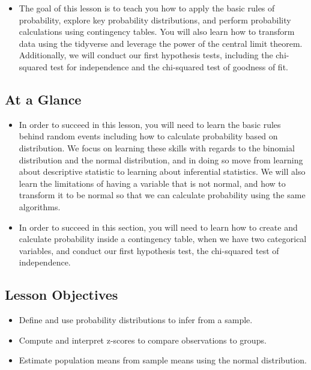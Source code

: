 \documentclass[
  letterpaper,
  DIV=11,
  numbers=noendperiod]{scrreprt}
\providecommand{\tightlist}{%
  \setlength{\itemsep}{0pt}\setlength{\parskip}{0pt}}\usepackage{longtable,booktabs,array}
\begin{document}
\begin{itemize}
\tightlist
\item
  The goal of this lesson is to teach you how to apply the basic rules
  of probability, explore key probability distributions, and perform
  probability calculations using contingency tables. You will also learn
  how to transform data using the tidyverse and leverage the power of
  the central limit theorem. Additionally, we will conduct our first
  hypothesis tests, including the chi-squared test for independence and
  the chi-squared test of goodness of fit.
\end{itemize}

\subsection{At a Glance}\label{at-a-glance-3}

\begin{itemize}
\tightlist
\item
  In order to succeed in this lesson, you will need to learn the basic
  rules behind random events including how to calculate probability
  based on distribution. We focus on learning these skills with regards
  to the binomial distribution and the normal distribution, and in doing
  so move from learning about descriptive statistic to learning about
  inferential statistics. We will also learn the limitations of having a
  variable that is not normal, and how to transform it to be normal so
  that we can calculate probability using the same algorithms.
\item
  In order to succeed in this section, you will need to learn how to
  create and calculate probability inside a contingency table, when we
  have two categorical variables, and conduct our first hypothesis test,
  the chi-squared test of independence.
\end{itemize}

\subsection{Lesson Objectives}\label{lesson-objectives-3}

\begin{itemize}
\tightlist
\item
  Define and use probability distributions to infer from a sample.
\item
  Compute and interpret z-scores to compare observations to groups.
\item
  Estimate population means from sample means using the normal
  distribution.
\end{itemize}
\end{document}
